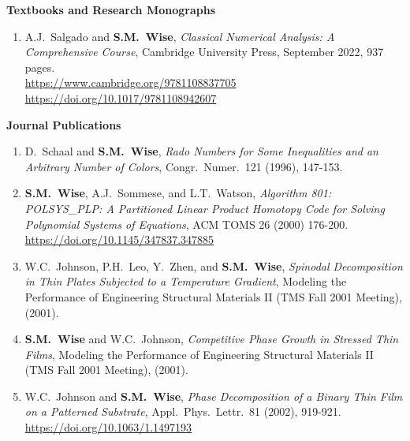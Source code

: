 \documentclass[11pt]{letter}
\begin{document}
{\LARGE\bf  Textbooks and Research Monographs}
    \begin{enumerate}
    \item
A.J.~Salgado and \textbf{S.M.~Wise}, {\sl Classical Numerical Analysis: A Comprehensive Course}, Cambridge University Press, September 2022, 937 pages.
	\\
\url{https://www.cambridge.org/9781108837705}
	\\
\url{https://doi.org/10.1017/9781108942607}
    \end{enumerate}



{\LARGE\bf  Journal Publications}
    \begin{enumerate}

    \item
D.~Schaal and \textbf{S.M.~Wise}, {\sl Rado Numbers for Some Inequalities and an Arbitrary Number of Colors}, Congr.~Numer.~121 (1996), 147-153.

    \item
\textbf{S.M.~Wise}, A.J.~Sommese, and L.T.~Watson, {\sl Algorithm 801: POLSYS\_PLP: A Partitioned Linear Product Homotopy Code for Solving Polynomial Systems of Equations}, ACM TOMS 26 (2000) 176-200.
	\\
\url{https://doi.org/10.1145/347837.347885}

    \item
W.C.~Johnson, P.H.~Leo, Y.~Zhen, and \textbf{S.M.~Wise}, {\sl Spinodal Decomposition in Thin Plates Subjected to a Temperature Gradient}, Modeling the Performance of Engineering Structural Materials II (TMS Fall 2001 Meeting), (2001).

    \item
\textbf{S.M.~Wise} and W.C.~Johnson, {\sl Competitive Phase Growth in Stressed Thin Films}, Modeling the Performance of Engineering Structural Materials II (TMS Fall 2001 Meeting), (2001).

    \item
W.C.~Johnson and \textbf{S.M.~Wise}, {\sl Phase Decomposition of a Binary Thin Film on a Patterned Substrate}, Appl.~Phys.~Lettr.~81 (2002), 919-921.
	\\
\url{https://doi.org/10.1063/1.1497193}


\end{enumerate}
\end{document}
